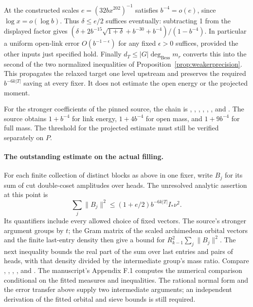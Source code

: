 At the constructed scales $e=(32 b x^{202})^{-1}$ satisfies
$b^{-4}=o(e)$, since $\log x=o(\log b)$. Thus
$\delta\le e/2$ suffices eventually: subtracting 1 from the displayed
factor gives $(\delta+2b^{-15}\sqrt{1+\delta}+b^{-30}+b^{-4})/
(1-b^{-4})$. In particular a uniform open-link error
$O(b^{-1-\epsilon})$ for any fixed $\epsilon>0$ suffices, provided
the other inputs just specified hold. Finally
$d_T\le |G|\deg_{\mathrm{Bess}} m_r$ converts this into
the second of the two normalized inequalities of Proposition~\ref{prop:weakerprecision}.
This propagates the relaxed target one level upstream and preserves
the required $b^{-6k|T|}$ saving at every fixer. It does not estimate
the open energy or the projected moment.

For the stronger coefficients of the pinned source, the chain is
,
,
,
,
,
,
and .
The source obtains $1+b^{-4}$ for link energy, $1+4b^{-4}$ for open
mass, and $1+9b^{-4}$ for full mass. The threshold for the projected
estimate must still be verified separately on $P$.

\paragraph{The outstanding estimate on the actual filling.}
For each finite collection of distinct blocks as above in one fixer,
write $B_j$ for its sum of cut double-coset amplitudes over heads.
The unresolved analytic assertion at this point is
\[
   \sum_j\|B_j\|^2
       \le (1+e/2)b^{-6k|T|} I_*\nu^2.
\]
Its quantifiers include every allowed choice of fixed vectors. The
source's stronger argument groups by $t$; the Gram matrix of the
scaled archimedean orbital vectors and the finite last-entry density
then give a bound for $R_{k-1}^2\sum_j\|B_j\|^2$. The next inequality
bounds the real part of the sum over last entries and pairs of heads,
with that density divided by the intermediate group's mass ratio.
Compare ,
,
,
, and
.
The manuscript's Appendix F.1 computes the numerical comparison
conditional on the fitted measures and inequalities. The rational
normal form and the error transfer above supply two intermediate
arguments; an independent derivation of the fitted orbital and sieve
bounds is still required.
